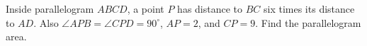 Inside parallelogram $ABCD$, a point $P$ has distance to $BC$ six times its distance to $AD$. Also $\angle APB=\angle CPD=90^\circ$, $AP=2$, and $CP=9$. Find the parallelogram area.
